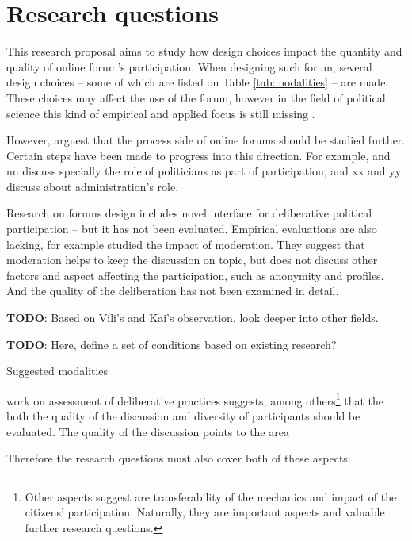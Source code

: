 \documentclass[journal,a4paper]{IEEEtran}
\begin{document}
\section{Research questions}

This research proposal aims to study how design choices impact the quantity and quality of online forum's participation. When designing such forum, several design choices -- some of which are listed on Table \ref{tab:modalities} -- are made. These choices may affect the use of the forum, however in the field of political science this kind of empirical and applied focus is still missing \cite[256]{wright12}.

However,  arguest that the process side of online forums should be studied further. Certain steps have been made to progress into this direction. For example,  and nn discuss specially the role of politicians as part of participation, and xx and yy discuss about administration's role.

Research on forums design includes  novel interface for deliberative political participation -- but it has not been evaluated. Empirical evaluations are also lacking, for example  studied the impact of moderation. They suggest that moderation helps to keep the discussion on topic, but does not discuss other factors and aspect affecting the participation, such as anonymity and profiles. And the quality of the deliberation has not been examined in detail.

\textbf{TODO}: Based on Vili's and Kai's observation, look deeper into other fields.

\begin{table}
\textbf{TODO}: Here, define a set of conditions based on existing research?
\caption{Suggested modalities}
\label{tab:modalities}
\end{table}

 work on assessment of deliberative practices suggests, among others\footnote{Other aspects  suggest are transferability of the mechanics and impact of the citizens' participation. Naturally, they are important aspects and valuable further research questions.} that the both the quality of the discussion and diversity of participants should be evaluated. The quality of the discussion points to the area

Therefore the research questions must also cover both of these aspects:
\end{document}
